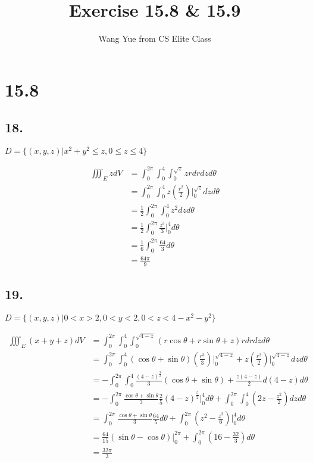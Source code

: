 \documentclass{article}
\begin{document}
  \title{Exercise 15.8 \& 15.9}
  \author{Wang Yue from CS Elite Class}
  \maketitle

  \section*{15.8}

  \subsection*{18. }

  $D = \{ (x, y, z) | x^2 + y^2 \leq z, 0 \leq z \leq 4 \}$

  $$\begin{aligned}
    \iiint_E z dV &= \int_0^{2\pi} \int_0^4 \int_0^{\sqrt z} zr dr dz d\theta \\
    &= \int_0^{2\pi} \int_0^4 z (\frac{r^2}{2})\biggl|_0^{\sqrt z} dz d\theta \\
    &= \frac 1 2 \int_0^{2\pi} \int_0^4 z^2 dz d\theta \\
    &= \frac 1 2 \int_0^{2\pi} \frac{z^3}{3}\biggl|_0^4 d\theta \\
    &= \frac 1 6 \int_0^{2\pi} \frac{64}{3} d\theta \\
    &= \frac{64\pi}{9}
  \end{aligned}$$

  \subsection*{19. }

  $D = \{ (x, y, z) | 0 < x > 2, 0 < y < 2, 0 < z < 4 - x^2 - y^2 \}$

  $$\begin{aligned}
    \iiint_E (x + y + z) dV &= \int_0^{2\pi} \int_0^4 \int_0^{\sqrt{4-z}} (r\cos \theta + r\sin \theta + z) r dr dz d\theta \\
    &= \int_0^{2\pi} \int_0^4 (\cos \theta + \sin \theta)(\frac{r^3}{3})\biggl|_0^{\sqrt{4-z}} + z(\frac{r^2}{2})\biggl|_0^{\sqrt{4-z}} dz d\theta \\
    &= -\int_0^{2\pi} \int_0^4 \frac{(4-z)^{\frac 3 2}}{3}(\cos \theta + \sin \theta) + \frac{z(4-z)}{2} d(4-z) d\theta \\
    &= -\int_0^{2\pi} \frac{\cos \theta + \sin \theta}{3} \frac 2 5 (4-z)^{\frac 5 2}\biggl|_0^{4} d\theta + \int_0^{2\pi} \int_0^4 (2z - \frac{z^2}{2}) dz d\theta \\
    &= \int_0^{2\pi} \frac{\cos \theta + \sin \theta}{3} \frac{64}{5} d\theta + \int_0^{2\pi} (z^2 - \frac{z^3}{6})\biggl|_0^4 d\theta \\
    &= \frac{64}{15} (\sin \theta - \cos \theta)\biggl|_0^{2\pi} + \int_0^{2\pi} (16 - \frac{32}{3})d\theta \\
    &= \frac{32\pi}{3}
  \end{aligned}$$
\end{document}
